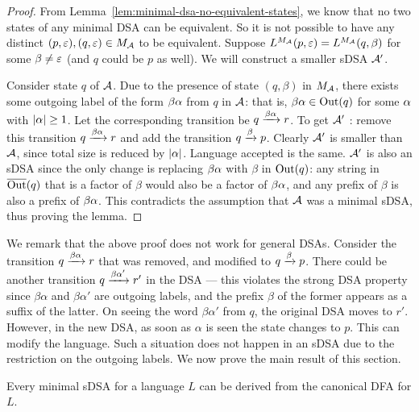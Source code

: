 \begin{proof}
From Lemma~\ref{lem:minimal-dsa-no-equivalent-states}, we know that no two states of any minimal DSA can be equivalent. So it is not possible to have any distinct $(p,\varepsilon),(q,\varepsilon) \in M_{\mathcal{A}}$ to be equivalent. Suppose $L^{M_{\mathcal{A}}}(p, \varepsilon) = L^{M_{\mathcal{A}}}(q, \beta)$ for some $\beta \ne \varepsilon$ (and $q$ could be $p$ as well). We will construct a smaller sDSA $\mathcal{A}'$. 

Consider state $q$ of $\mathcal{A}$. Due to the presence of state $(q, \beta)$ in $M_{\mathcal{A}}$, there exists some outgoing label of the form $\beta\alpha$ from $q$ in $\mathcal{A}$: that is, $\beta\alpha \in \operatorname{Out}(q)$ for some $\alpha$ with $|\alpha| \ge 1$. Let the corresponding transition be $q \xrightarrow{\beta\alpha} r$. To get $\mathcal{A}'$ : remove this transition $q\xrightarrow{\beta\alpha}r$ and add the transition $q\xrightarrow{\beta}p$. Clearly $\mathcal{A}'$ is smaller than $\mathcal{A}$, since total size is reduced by $|\alpha|$. Language accepted is the same. $\mathcal{A}'$ is also an sDSA since the only change is replacing $\beta\alpha$ with $\beta$ in $\operatorname{Out}(q)$: any string in $\overline{\operatorname{Out}}(q)$ that is a factor of $\beta$ would also be a factor of $\beta\alpha$, and any prefix of $\beta$ is also a prefix of $\beta\alpha$. This contradicts the assumption that $\mathcal{A}$ was a minimal sDSA, thus proving the lemma.
\end{proof}

We remark that the above proof does not work for general DSAs. Consider the transition $q \xrightarrow{\beta \alpha} r$ that was removed, and modified to $q \xrightarrow{\beta} p$. There could be another transition $q \xrightarrow{\beta \alpha'} r'$ in the DSA --- this violates the strong DSA property since $\beta \alpha$ and $\beta \alpha'$ are outgoing labels, and the prefix $\beta$ of the former appears as a suffix of the latter. On seeing the word $\beta \alpha'$ from $q$, the original DSA moves to $r'$. However, in the new DSA, as soon as $\alpha$ is seen the state changes to $p$. This can modify the language. Such a situation does not happen in an sDSA due to the restriction on the outgoing labels. We now prove the main result of this section.

\begin{theorem}\label{thm:sdsa-from-min-dfa}
Every minimal sDSA for a language $L$ can be derived from the canonical DFA for $L$.
\end{theorem}


